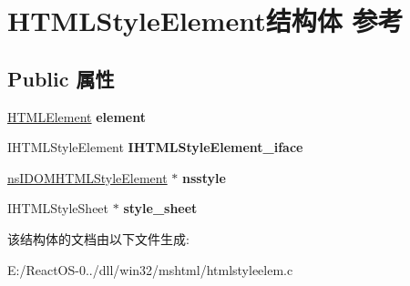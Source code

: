 \hypertarget{struct_h_t_m_l_style_element}{}\section{H\+T\+M\+L\+Style\+Element结构体 参考}
\label{struct_h_t_m_l_style_element}
\subsection*{Public 属性}
\begin{DoxyCompactItemize}
\item 
\mbox{\label{struct_h_t_m_l_style_element_a40fe7b9cf1bbed2696fba07731580839}} 
\hyperlink{struct_h_t_m_l_element}{H\+T\+M\+L\+Element} {\bfseries element}
\item 
\mbox{\label{struct_h_t_m_l_style_element_af82cb74b041bfa55df83b47978ca02f7}} 
I\+H\+T\+M\+L\+Style\+Element {\bfseries I\+H\+T\+M\+L\+Style\+Element\+\_\+iface}
\item 
\mbox{\label{struct_h_t_m_l_style_element_a150d40b06f24ae9bea011f5ee4a7afc9}} 
\hyperlink{interfacens_i_d_o_m_h_t_m_l_style_element}{ns\+I\+D\+O\+M\+H\+T\+M\+L\+Style\+Element} $\ast$ {\bfseries nsstyle}
\item 
\mbox{\label{struct_h_t_m_l_style_element_a58a6d65b78ae2a43ebf0c3192a47e1fb}} 
I\+H\+T\+M\+L\+Style\+Sheet $\ast$ {\bfseries style\+\_\+sheet}
\end{DoxyCompactItemize}


该结构体的文档由以下文件生成\+:\begin{DoxyCompactItemize}
\item 
E\+:/\+React\+O\+S-\/0../dll/win32/mshtml/htmlstyleelem.\+c\end{DoxyCompactItemize}
